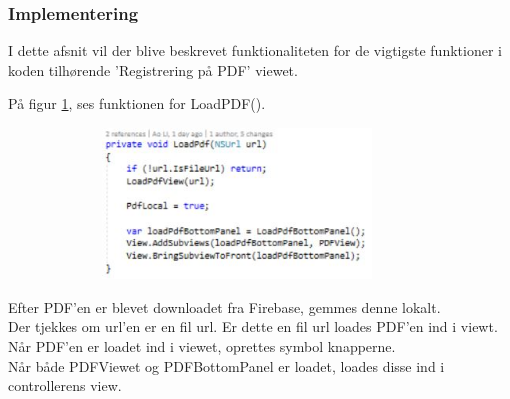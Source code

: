\clearpage

\subsubsection{Implementering}
I dette afsnit vil der blive beskrevet funktionaliteten for de vigtigste funktioner i koden tilhørende 'Registrering på PDF' viewet.

På figur \ref{fig:LoadPDF}, ses funktionen for LoadPDF().
\begin{figure}[H] %
	\centering
	\includegraphics[height=4cm, width=10cm]{../ArkitekturDesign/Design/RegisterPDF/LoadPDF}
	\caption{}
	\label{fig:LoadPDF}
\end{figure}
Efter PDF'en er blevet downloadet fra Firebase, gemmes denne lokalt. \\
Der tjekkes om url'en er en fil url. Er dette en fil url loades PDF'en ind i viewt. \\
Når PDF'en er loadet ind i viewet, oprettes symbol knapperne. \\
Når både PDFViewet og PDFBottomPanel er loadet, loades disse ind i controllerens view.

\clearpage

